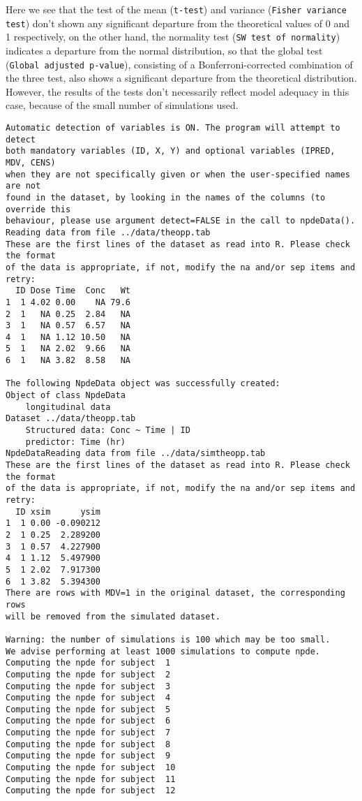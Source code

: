 Here we see that the test of the mean (\texttt{t-test}) and variance (\texttt{Fisher variance test}) don't shown any significant departure from the theoretical values of 0 and 1 respectively, on the other hand, the normality test (\texttt{SW test of normality}) indicates a departure from the normal distribution, so that the global test (\texttt{Global adjusted p-value}), consisting of a Bonferroni-corrected combination of the three test, also shows a significant departure from the theoretical distribution. However, the results of the tests don't necessarily reflect model adequacy in this case, because of the small number of simulations used.
{\small
\begin{verbatim}
Automatic detection of variables is ON. The program will attempt to detect
both mandatory variables (ID, X, Y) and optional variables (IPRED, MDV, CENS) 
when they are not specifically given or when the user-specified names are not 
found in the dataset, by looking in the names of the columns (to override this 
behaviour, please use argument detect=FALSE in the call to npdeData().
Reading data from file ../data/theopp.tab 
These are the first lines of the dataset as read into R. Please check the format 
of the data is appropriate, if not, modify the na and/or sep items and retry:
  ID Dose Time  Conc   Wt
1  1 4.02 0.00    NA 79.6
2  1   NA 0.25  2.84   NA
3  1   NA 0.57  6.57   NA
4  1   NA 1.12 10.50   NA
5  1   NA 2.02  9.66   NA
6  1   NA 3.82  8.58   NA

The following NpdeData object was successfully created:
Object of class NpdeData
    longitudinal data
Dataset ../data/theopp.tab 
    Structured data: Conc ~ Time | ID 
    predictor: Time (hr) 
NpdeDataReading data from file ../data/simtheopp.tab 
These are the first lines of the dataset as read into R. Please check the format 
of the data is appropriate, if not, modify the na and/or sep items and retry:
  ID xsim      ysim
1  1 0.00 -0.090212
2  1 0.25  2.289200
3  1 0.57  4.227900
4  1 1.12  5.497900
5  1 2.02  7.917300
6  1 3.82  5.394300
There are rows with MDV=1 in the original dataset, the corresponding rows 
will be removed from the simulated dataset.

Warning: the number of simulations is 100 which may be too small.
We advise performing at least 1000 simulations to compute npde.
Computing the npde for subject  1 
Computing the npde for subject  2 
Computing the npde for subject  3 
Computing the npde for subject  4 
Computing the npde for subject  5 
Computing the npde for subject  6 
Computing the npde for subject  7 
Computing the npde for subject  8 
Computing the npde for subject  9 
Computing the npde for subject  10 
Computing the npde for subject  11 
Computing the npde for subject  12 


\end{verbatim}}
